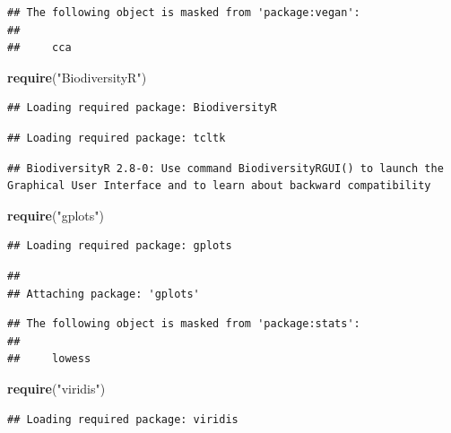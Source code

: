 \documentclass[]{article}
\newenvironment{Shaded}{\begin{snugshade}}{\end{snugshade}}
\newcommand{\KeywordTok}[1]{\textcolor[rgb]{0.13,0.29,0.53}{\textbf{{#1}}}}
\newcommand{\StringTok}[1]{\textcolor[rgb]{0.31,0.60,0.02}{{#1}}}
\newcommand{\NormalTok}[1]{{#1}}
\begin{document}
\begin{verbatim}
## The following object is masked from 'package:vegan':
## 
##     cca
\end{verbatim}

\begin{Shaded}
\begin{Highlighting}[]
\KeywordTok{require}\NormalTok{(}\StringTok{"BiodiversityR"}\NormalTok{)}
\end{Highlighting}
\end{Shaded}

\begin{verbatim}
## Loading required package: BiodiversityR
\end{verbatim}

\begin{verbatim}
## Loading required package: tcltk
\end{verbatim}

\begin{verbatim}
## BiodiversityR 2.8-0: Use command BiodiversityRGUI() to launch the Graphical User Interface and to learn about backward compatibility
\end{verbatim}

\begin{Shaded}
\begin{Highlighting}[]
\KeywordTok{require}\NormalTok{(}\StringTok{"gplots"}\NormalTok{)}
\end{Highlighting}
\end{Shaded}

\begin{verbatim}
## Loading required package: gplots
\end{verbatim}

\begin{verbatim}
## 
## Attaching package: 'gplots'
\end{verbatim}

\begin{verbatim}
## The following object is masked from 'package:stats':
## 
##     lowess
\end{verbatim}

\begin{Shaded}
\begin{Highlighting}[]
\KeywordTok{require}\NormalTok{(}\StringTok{"viridis"}\NormalTok{)}
\end{Highlighting}
\end{Shaded}

\begin{verbatim}
## Loading required package: viridis
\end{verbatim}
\end{document}
